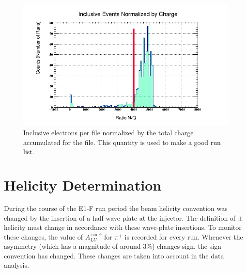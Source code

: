 \begin{figure}
	\label{fig:inclusive_rates}
	\begin{center}
		\includegraphics[width=14cm]{image/plots/basic-analysis/inclusive-rates.png}
		\caption{Inclusive electrons per file normalized by the total charge accumulated for the file.  This quantity is used to make a good run list.}
	\end{center}
\end{figure}

\section{Helicity Determination}
During the course of the E1-F run period the beam helicity convention was changed by the insertion of a half-wave plate at the injector.  The definition of $\pm$ helicity must change in accordance with these wave-plate insertions.  To monitor these changes, the value of $A_{LU}^{\sin\phi}$ for $\pi^+$ is recorded for every run.  Whenever the asymmetry (which has a magnitude of around $3\%$) changes sign, the sign convention has changed.  These changes are taken into account in the data analysis.   


